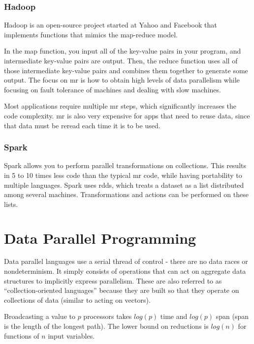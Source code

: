 \documentclass[10pt]{article}
\newcounter{subsubsubsection}[subsubsection]
\begin{document}
\begin{flushleft}
\subsubsection{Hadoop}

Hadoop is an open-source project started at Yahoo and Facebook that implements functions that mimics the map-reduce model. 


In the map function, you input all of the key-value pairs in your program, and intermediate key-value pairs are output. Then, the reduce function uses all of those intermediate key-value pairs and combines them together to generate some output. The focus on \gls{mr} is how to obtain high levels of data parallelism while focusing on fault tolerance of machines and dealing with slow machines.

Most applications require multiple \gls{mr} steps, which significantly increases the code complexity. \gls{mr} is also very expensive for apps that need to reuse data, since that data must be reread each time it is to be used.

\subsubsection{Spark}

Spark allows you to perform parallel transformations on collections. This results in 5 to 10 times less code than the typical \gls{mr} code, while having portability to multiple languages. Spark uses \gls{rdd}s, which treats a dataset as a list distributed among several machines. Transformations and actions can be performed on these lists. 

\section{Data Parallel Programming}

Data parallel languages use a serial thread of control - there are no data races or nondeterminism. It simply consists of operations that can act on aggregate data structures to implicitly express parallelism. 
These are also referred to as ``collection-oriented languages'' because they are built so that they operate on collections of data (similar to acting on vectors). 

Broadcasting a value to \(p\) processors takes \(log(p)\) time and \(log(p)\) span (span is the length of the longest path). The lower bound on reductions is \(log(n)\) for functions of \(n\) input variables. 


\end{flushleft}
\end{document}
